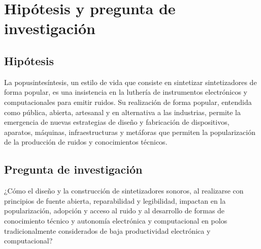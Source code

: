 \documentclass[../proyecto.tex]{subfiles}
\begin{document}
\section{Hipótesis y pregunta de investigación}

\subsection{Hipótesis}

La popusintesíntesis, un estilo de vida que consiste en sintetizar sintetizadores de forma popular, es una insistencia en la luthería de instrumentos electrónicos y computacionales para emitir ruidos. Su realización de forma popular, entendida como pública, abierta, artesanal y en alternativa a las industrias, permite la emergencia de nuevas estrategias de diseño y fabricación de dispositivos, aparatos, máquinas, infraestructuras y metáforas que permiten la popularización de la producción de ruidos y conocimientos técnicos.

\subsection{Pregunta de investigación}

¿Cómo el diseño y la construcción de sintetizadores sonoros, al realizarse con principios de fuente abierta, reparabilidad y legibilidad, impactan en la popularización, adopción y acceso al ruido y al desarrollo de formas de conocimiento técnico y autonomía electrónica y computacional en polos tradicionalmente considerados de baja productividad electrónica y computacional?

\end{document}
